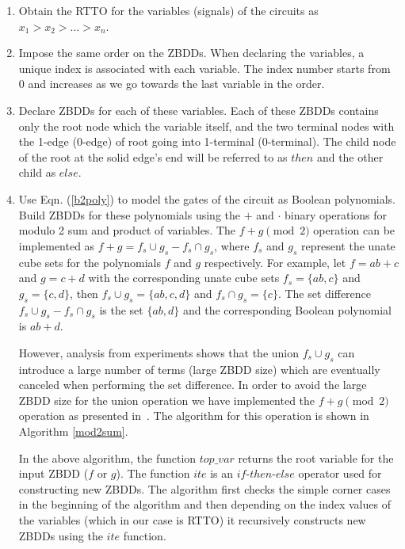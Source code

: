 \documentclass{article}
\begin{document}
\begin{enumerate}
	\item Obtain the RTTO for the variables (signals) of the circuits as $x_1 > x_2 > \dots > x_n$.
	
	\item Impose the same order on the ZBDDs. When declaring the variables, a unique index is associated with
	each variable. The index number starts from 0 and increases as we go towards the last variable in the order.
	
	\item Declare ZBDDs for each of these variables. Each of these ZBDDs contains only the root node which the variable itself,
	and the two terminal nodes with the 1-edge (0-edge) of root going into 1-terminal (0-terminal). The child 
	node of the root at the solid edge's end will be referred to as $then$ and the other child as $else$.
	
	\item Use Eqn. (\ref{b2poly}) to model the gates of the circuit as Boolean polynomials. Build ZBDDs for
	these polynomials using the $+$ and $\cdot$ binary operations for modulo 2 sum and product of variables. 
	The  $f+g\pmod 2$ operation can be implemented as $f+g = f_s \cup g_s - f_s \cap g_s$, 
	where $f_s$ and $g_s$ represent the unate cube sets for the polynomials $f$ and $g$ respectively. 
	For example, let $f = ab + c$ and $g = c + d$ with the corresponding unate cube sets
	 $f_s = \{ab,c\}$ and $g_s = \{c,d\}$, then $f_s \cup g_s = \{ab,c,d\}$ and 
	$f_s \cap g_s = \{c\}$. The set difference $f_s \cup g_s - f_s \cap g_s$ is the set $\{ab,d\}$
	and the corresponding Boolean polynomial is $ab + d$. 
	\par	However, analysis from experiments shows that the union $f_s \cup g_s$ can introduce a
	large number of terms (large ZBDD size) which are eventually canceled when performing the set difference.
	In order to avoid the large ZBDD size for the union operation we have implemented the $f+g\pmod 2$
	operation as presented in~\cite{polybori:2009}. The algorithm for this operation is shown in
	Algorithm \ref{mod2sum}. 
	\par In the above algorithm, the function $top\_var$ returns the root variable
	for the input ZBDD ($f$ or $g$). The function $ite$ is an $if$-$then$-$else$
	operator used for constructing new ZBDDs. The algorithm first checks the  
	simple corner cases in the beginning of the algorithm and then depending
	on the index values of the variables (which in our case is RTTO) it recursively constructs 
	new ZBDDs using the $ite$ function. 


\end{enumerate}
\end{document}
